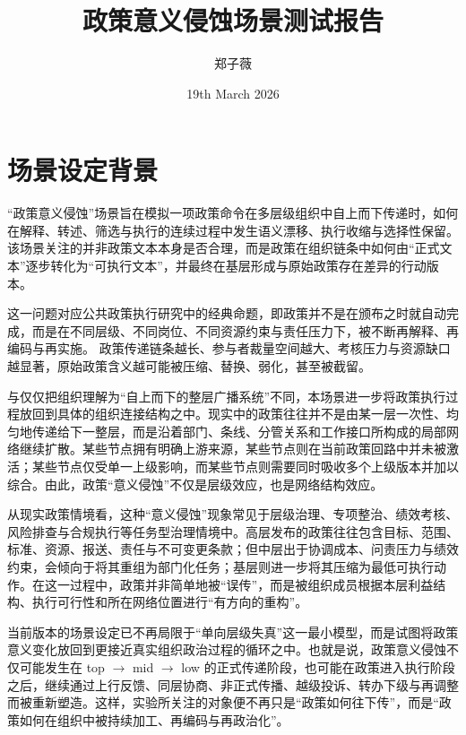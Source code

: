 \documentclass{article}
\title{政策意义侵蚀场景测试报告}
\author{郑子薇}
\date{19th March 2026}
\begin{document}
\maketitle

\section{场景设定背景}

“政策意义侵蚀”场景旨在模拟一项政策命令在多层级组织中自上而下传递时，如何在解释、转述、筛选与执行的连续过程中发生语义漂移、执行收缩与选择性保留。该场景关注的并非政策文本本身是否合理，而是政策在组织链条中如何由“正式文本”逐步转化为“可执行文本”，并最终在基层形成与原始政策存在差异的行动版本。\cite{PressmanWildavsky1984}\cite{Lipsky2010}

这一问题对应公共政策执行研究中的经典命题，即政策并不是在颁布之时就自动完成，而是在不同层级、不同岗位、不同资源约束与责任压力下，被不断再解释、再编码与再实施。\cite{PressmanWildavsky1984}\cite{SabatierMazmanian1980} 政策传递链条越长、参与者裁量空间越大、考核压力与资源缺口越显著，原始政策含义越可能被压缩、替换、弱化，甚至被截留。\cite{HillHupe2002}\cite{Lipsky2010}

与仅仅把组织理解为“自上而下的整层广播系统”不同，本场景进一步将政策执行过程放回到具体的组织连接结构之中。现实中的政策往往并不是由某一层一次性、均匀地传递给下一整层，而是沿着部门、条线、分管关系和工作接口所构成的局部网络继续扩散。某些节点拥有明确上游来源，某些节点则在当前政策回路中并未被激活；某些节点仅受单一上级影响，而某些节点则需要同时吸收多个上级版本并加以综合。由此，政策“意义侵蚀”不仅是层级效应，也是网络结构效应。\cite{HillHupe2002}\cite{Weick1995}

从现实政策情境看，这种“意义侵蚀”现象常见于层级治理、专项整治、绩效考核、风险排查与合规执行等任务型治理情境中。高层发布的政策往往包含目标、范围、标准、资源、报送、责任与不可变更条款；但中层出于协调成本、问责压力与绩效约束，会倾向于将其重组为部门化任务；基层则进一步将其压缩为最低可执行动作。在这一过程中，政策并非简单地被“误传”，而是被组织成员根据本层利益结构、执行可行性和所在网络位置进行“有方向的重构”。\cite{Lipsky2010}\cite{Weick1995}

当前版本的场景设定已不再局限于“单向层级失真”这一最小模型，而是试图将政策意义变化放回到更接近真实组织政治过程的循环之中。也就是说，政策意义侵蚀不仅可能发生在 top $\rightarrow$ mid $\rightarrow$ low 的正式传递阶段，也可能在政策进入执行阶段之后，继续通过上行反馈、同层协商、非正式传播、越级投诉、转办下级与再调整而被重新塑造。这样，实验所关注的对象便不再只是“政策如何往下传”，而是“政策如何在组织中被持续加工、再编码与再政治化”。
\end{document}
